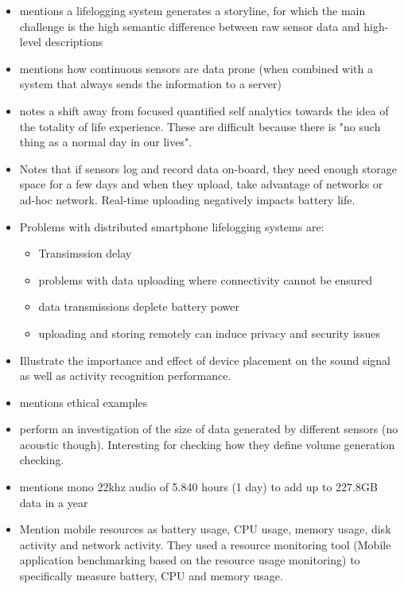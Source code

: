 \begin{itemize}
	\item \cite{bayindir2017survey} mentions a lifelogging system generates a storyline, for which the main challenge is the high semantic difference between raw sensor data and high-level descriptions
	\item \cite{khan2019smartphone} mentions how continuous sensors are data prone (when combined with a system that always sends the information to a server)
	\item \cite{gurrin2014lifelogging} notes a shift away from focused quantified self analytics towards the idea of the totality of life experience. These are difficult because there is "no such thing as a normal day in our lives".
	\item \cite{gurrin2014lifelogging} Notes that if sensors log and record data on-board, they need enough storage space for a few days and when they upload, take advantage of networks or ad-hoc network. Real-time uploading negatively impacts battery life.
	\item \cite{ali2019insight} Problems with distributed smartphone lifelogging systems are:
	\begin{itemize}
		\item Transimssion delay
		\item problems with data uploading where connectivity cannot be ensured
		\item data transmissions deplete battery power
		\item uploading and storing remotely can induce privacy and security issues
	\end{itemize}
	\item \cite{min2018exploring} Illustrate the importance and effect of device placement on the sound signal as well as activity recognition performance.
\end{itemize}

\begin{itemize}
	\item \cite{gurrin2014lifelogging} mentions ethical examples
\end{itemize}

\begin{itemize}
	\item \cite{khan2019smartphone} perform an investigation of the size of data generated by different sensors (no acoustic though). Interesting for checking how they define volume generation checking.
	\item \cite{gurrin2014lifelogging} mentions mono 22khz audio of 5.840 hours (1 day) to add up to 227.8GB data in a year
	\item \cite{rawassizadeh2013ubiqlog} Mention mobile resources as battery usage, CPU usage, memory usage, disk activity and network activity. They used a resource monitoring tool (Mobile application benchmarking based on the resource usage monitoring) to specifically measure battery, CPU and memory usage.
\end{itemize}

